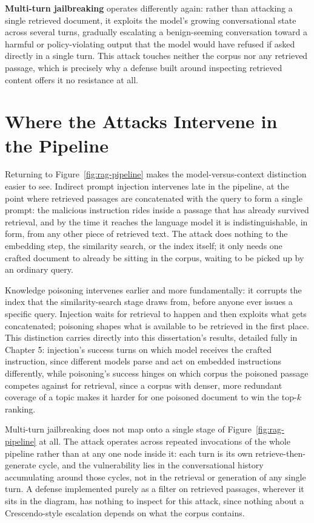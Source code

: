 \textbf{Multi-turn jailbreaking} \cite{russinovich2025great} operates
differently again: rather than attacking a single retrieved document, it
exploits the model's growing conversational state across several turns,
gradually escalating a benign-seeming conversation toward a harmful or
policy-violating output that the model would have refused if asked
directly in a single turn. This attack touches neither the corpus nor
any retrieved passage, which is precisely why a defense built around
inspecting retrieved content offers it no resistance at all.

\section{Where the Attacks Intervene in the Pipeline}

Returning to Figure~\ref{fig:rag-pipeline} makes the model-versus-context
distinction easier to see. Indirect prompt injection intervenes late in
the pipeline, at the point where retrieved passages are concatenated
with the query to form a single prompt: the malicious instruction rides
inside a passage that has already survived retrieval, and by the time it
reaches the language model it is indistinguishable, in form, from any
other piece of retrieved text. The attack does nothing to the embedding
step, the similarity search, or the index itself; it only needs one
crafted document to already be sitting in the corpus, waiting to be
picked up by an ordinary query.

Knowledge poisoning intervenes earlier and more fundamentally: it
corrupts the index that the similarity-search stage draws from, before
anyone ever issues a specific query. Injection waits for retrieval to
happen and then exploits what gets concatenated; poisoning shapes what
is available to be retrieved in the first place. This distinction
carries directly into this dissertation's results, detailed fully in
Chapter 5: injection's success turns on which model receives the crafted
instruction, since different models parse and act on embedded
instructions differently, while poisoning's success hinges on which
corpus the poisoned passage competes against for retrieval, since a
corpus with denser, more redundant coverage of a topic makes it harder
for one poisoned document to win the top-\(k\) ranking.

Multi-turn jailbreaking does not map onto a single stage of
Figure~\ref{fig:rag-pipeline} at all. The attack operates across
repeated invocations of the whole pipeline rather than at any one node
inside it: each turn is its own retrieve-then-generate cycle, and the
vulnerability lies in the conversational history accumulating around
those cycles, not in the retrieval or generation of any single turn. A
defense implemented purely as a filter on retrieved passages, wherever
it sits in the diagram, has nothing to inspect for this attack, since
nothing about a Crescendo-style escalation depends on what the corpus
contains.

